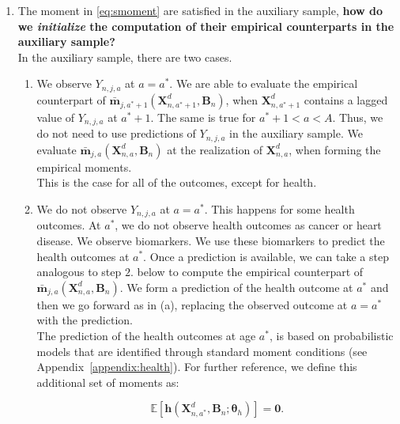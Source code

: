 \begin{enumerate}
\item The moment in \eqref{eq:smoment} are satisfied in the auxiliary sample, \textbf{how do we \textit{initialize} the computation of their empirical counterparts in the auxiliary sample?} \\ 
\noindent In the auxiliary sample, there are two cases.\\

\begin{enumerate}
\item We observe $Y_{n,j,a}$ at $a = a^*$. We are able to evaluate the empirical counterpart of $\bm{\bar{m}}_{j,a^*+1} \left( \bm{X}_{n,a^*+1}^d, \bm{B}_{n} \right) $, when $ \bm{X}_{n,a^*+1}^d$ contains a lagged value of $Y_{n,j,a}$ at $a^*+1$. The same is true for $a^*+1 < a < A$. Thus, we do not need to use predictions of $Y_{n,j,a}$ in the auxiliary sample. We evaluate $\bm{\bar{m}}_{j,a} \left( \bm{X}_{n,a}^d, \bm{B}_{n} \right)$ at  the realization of $\bm{X}_{n,a}^d$, when forming the empirical moments.\\

\noindent This is the case for all of the outcomes, except for health.\\

\item We do not observe $Y_{n,j,a}$ at $a = a^*$. This happens for some health outcomes. At $a^*$, we do not observe health outcomes as cancer or heart disease. We observe biomarkers.  We use these biomarkers to predict the health outcomes at $a^*$. Once a prediction is available, we can take a step analogous to step $2.$ below to compute the empirical counterpart of $\bm{\bar{m}}_{j,a} \left( \bm{X}_{n,a}^d, \bm{B}_{n} \right)$. We form a prediction of the health outcome at $a^*$ and then we go forward as in (a), replacing the observed outcome at $a = a^*$ with the prediction.\\

\noindent The prediction of the health outcomes at age $a^*$, is based on probabilistic models that are identified through standard moment conditions (see Appendix~\ref{appendix:health}). For further reference, we define this additional set of moments as: 

\begin{equation}
\mathbb{E} \left[ \mathbf{h} \left(  \bm{X}_{n,a^*}^d, \bm{B}_{n}; \bm{\theta}_{h}  \right) \right] = \mathbf{0}.
\end{equation}
\end{enumerate}


\end{enumerate}
